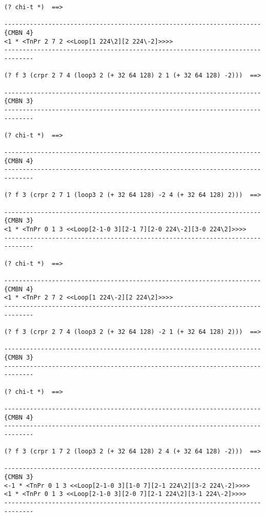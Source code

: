 {\footnotesize\begin{verbatim}
(? chi-t *)  ==>

----------------------------------------------------------------------{CMBN 4}
<1 * <TnPr 2 7 2 <<Loop[1 224\2][2 224\-2]>>>>
------------------------------------------------------------------------------

(? f 3 (crpr 2 7 4 (loop3 2 (+ 32 64 128) 2 1 (+ 32 64 128) -2)))  ==>

----------------------------------------------------------------------{CMBN 3}
------------------------------------------------------------------------------

(? chi-t *)  ==>

----------------------------------------------------------------------{CMBN 4}
------------------------------------------------------------------------------

(? f 3 (crpr 2 7 1 (loop3 2 (+ 32 64 128) -2 4 (+ 32 64 128) 2)))  ==>

----------------------------------------------------------------------{CMBN 3}
<1 * <TnPr 0 1 3 <<Loop[2-1-0 3][2-1 7][2-0 224\-2][3-0 224\2]>>>>
------------------------------------------------------------------------------

(? chi-t *)  ==>

----------------------------------------------------------------------{CMBN 4}
<1 * <TnPr 2 7 2 <<Loop[1 224\-2][2 224\2]>>>>
------------------------------------------------------------------------------

(? f 3 (crpr 2 7 4 (loop3 2 (+ 32 64 128) -2 1 (+ 32 64 128) 2)))  ==>

----------------------------------------------------------------------{CMBN 3}
------------------------------------------------------------------------------

(? chi-t *)  ==>

----------------------------------------------------------------------{CMBN 4}
------------------------------------------------------------------------------

(? f 3 (crpr 1 7 2 (loop3 2 (+ 32 64 128) 2 4 (+ 32 64 128) -2)))  ==>

----------------------------------------------------------------------{CMBN 3}
<-1 * <TnPr 0 1 3 <<Loop[2-1-0 3][1-0 7][2-1 224\2][3-2 224\-2]>>>>
<1 * <TnPr 0 1 3 <<Loop[2-1-0 3][2-0 7][2-1 224\2][3-1 224\-2]>>>>
------------------------------------------------------------------------------


\end{verbatim}}
